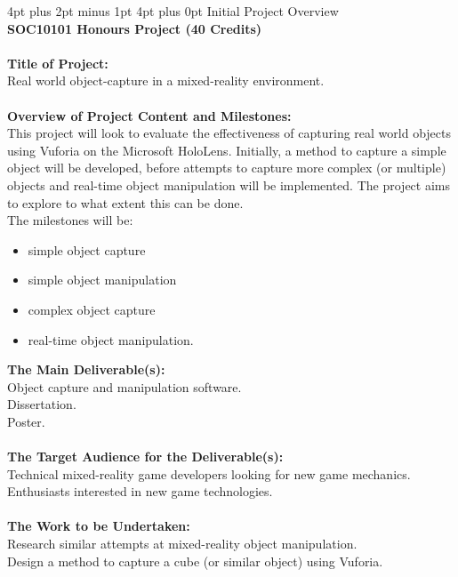 \documentclass[12pt,a4paper]{article}
\makeatletter
\renewcommand\section{\@startsection {section}{1}{0mm} %
                               {4pt plus 2pt minus 1pt} %
                               {4pt plus 0pt} %
                               {\Large\bfseries}}
\makeatother
\begin{document}
\newpage
\begin{appendices}
\section{Initial Project Overview}
 \ \\ \textbf{SOC10101 Honours Project (40 Credits)} \\ \\
\textbf{Title of Project:} \\
Real world object-capture in a mixed-reality environment. \\ \\
\textbf{Overview of Project Content and Milestones:} \\
This project will look to evaluate the effectiveness of capturing real world objects using Vuforia on the Microsoft HoloLens. Initially, a method to capture a simple object will be developed, before attempts to capture more complex (or multiple) objects and real-time object manipulation will be implemented. The project aims to explore to what extent this can be done. \\
The milestones will be: 
\begin{itemize}\itemsep0pt
	\item simple object capture
	\item simple object manipulation
	\item complex object capture
	\item real-time object manipulation.
\end{itemize}
\textbf{The Main Deliverable(s):} \\
Object capture and manipulation software. \\
Dissertation. \\
Poster. \\ \\
\textbf{The Target Audience for the Deliverable(s):} \\
Technical mixed-reality game developers looking for new game mechanics. \\
Enthusiasts interested in new game technologies. \\ \\
\textbf{The Work to be Undertaken:} \\
Research similar attempts at mixed-reality object manipulation. \\
Design a method to capture a cube (or similar object) using Vuforia. \\

\end{appendices}
\end{document}
